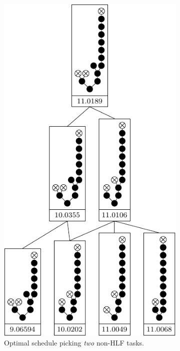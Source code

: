 \begin{figure}[ht]
  \centering
  \begin{subfigure}{.45\textwidth}
    \centering
    \includegraphics{p3/2hlf_suboptimal/001223368910111213_opt.pdf}
    \caption{Optimal schedule picking \emph{two} non-HLF tasks.}
  \end{subfigure}
  \quad
  \begin{subfigure}{.45\textwidth}
    \centering

\end{subfigure}
\end{figure}
